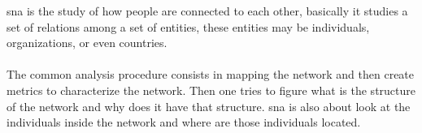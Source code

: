 %
%
%
%
%
%

\gls{sna} is the study of how people are connected to each other, basically it studies a set of relations among a set of entities,
these entities may be individuals, organizations, or even countries.\\\\
\indent The common analysis procedure consists in mapping the network and then create metrics to
characterize the network. Then one tries to figure what is the structure of the network and why does
it have that structure. \gls{sna} is also about look at the individuals inside the network and where are those individuals located.

